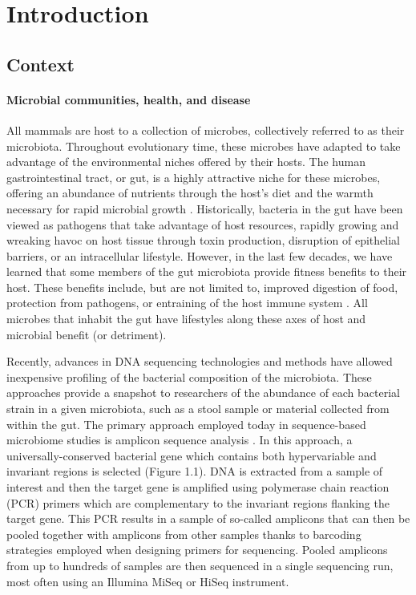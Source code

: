 \documentclass[11pt,twocolumn,notitlepage,openany,twoside]{book}
\begin{document}
\chapter{Introduction}
\begin{refsection}

\section{Context}

\subsubsection{Microbial communities, health, and disease}
All mammals are host to a collection of microbes, collectively referred to as their microbiota. Throughout evolutionary time, these microbes have adapted to take advantage of the environmental niches offered by their hosts. The human gastrointestinal tract, or gut, is a highly attractive niche for these microbes, offering an abundance of nutrients through the host’s diet and the warmth necessary for rapid microbial growth \cite{Turnbaugh2007-cd}. Historically, bacteria in the gut have been viewed as pathogens that take advantage of host resources, rapidly growing and wreaking havoc on host tissue through toxin production, disruption of epithelial barriers, or an intracellular lifestyle. However, in the last few decades, we have learned that some members of the gut microbiota provide fitness benefits to their host. These benefits include, but are not limited to, improved digestion of food, protection from pathogens, or entraining of the host immune system \cite{Britton2014-wm,Buffie2013-xt,Wilson1988-ed,Stecher2008-bc,Lawley2013-ez,Gillis2018-mt}. All microbes that inhabit the gut have lifestyles along these axes of host and microbial benefit (or detriment).

Recently, advances in DNA sequencing technologies and methods have allowed inexpensive profiling of the bacterial composition of the microbiota. These approaches provide a snapshot to researchers of the abundance of each bacterial strain in a given microbiota, such as a stool sample or material collected from within the gut. The primary approach employed today in sequence-based microbiome studies is amplicon sequence analysis \cite{Hugerth2017-dk}. In this approach, a universally-conserved bacterial gene which contains both hypervariable and invariant regions is selected (Figure 1.1). DNA is extracted from a sample of interest and then the target gene is amplified using polymerase chain reaction (PCR) primers which are complementary to the invariant regions flanking the target gene. This PCR results in a sample of so-called amplicons that can then be pooled together with amplicons from other samples thanks to barcoding strategies employed when designing primers for sequencing. Pooled amplicons from up to hundreds of samples are then sequenced in a single sequencing run, most often using an Illumina MiSeq or HiSeq instrument.


\end{refsection}
\end{document}

